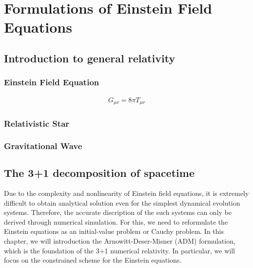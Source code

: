 
\chapter{Formulations of Einstein Field Equations}  %

\ifpdf
    \graphicspath{{Chapter1/Figs/PDF/}{Chapter1/Figs/}}
\else
    \graphicspath{{Chapter1/Figs/}}
\fi


\section{Introduction to general relativity} %
\label{section1.1}

\subsection{Einstein Field Equation} %
\label{section1.1.1}

\begin{align} \label{eq:Einstein_eq}
    G_{\mu\nu} = 8 \pi T_{\mu\nu}
\end{align}

\subsection{Relativistic Star} %
\label{section1.1.2}

\subsection{Gravitational Wave} %
\label{section1.1.3}

\section{The 3+1 decomposition of spacetime} %
\label{section1.2}

Due to the complexity and nonlinearity of Einstein field equations, it is extremely difficult to obtain analytical solution even for the simplest dynamical evolution systems.
Therefore, the accurate discription of the such systems can only be derived through numerical simulation.
For this, we need to reformulate the Einstein equations as an initial-value problem or Cauchy problem.
In this chapter, we will introduction the Arnowitt-Deser-Misner (ADM) formulation, which is the foundation of the 3+1 numerical relativity.
In particular, we will focus on the constrained scheme for the Einstein equations.

